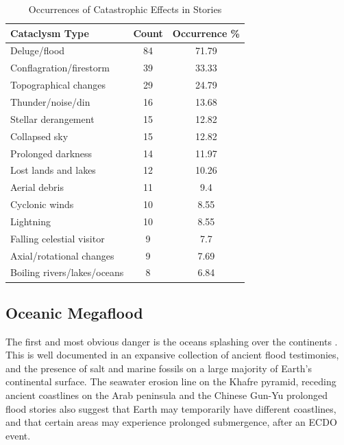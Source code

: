 \documentclass[10pt,twocolumn,letterpaper]{article}
\begin{document}
\begin{table}[ht]
\begin{center}
\renewcommand{\arraystretch}{1.2}  %
\begin{tabular}{|l|c|c|}
\hline
\textbf{Cataclysm Type} & \textbf{Count} & \textbf{Occurrence \%} \\
\hline\hline
Deluge/flood            & 84 & 71.79 \\
Conflagration/firestorm & 39 & 33.33 \\
Topographical changes   & 29 & 24.79 \\
Thunder/noise/din       & 16 & 13.68 \\
Stellar derangement     & 15 & 12.82 \\
Collapsed sky           & 15 & 12.82 \\
Prolonged darkness      & 14 & 11.97 \\
Lost lands and lakes    & 12 & 10.26 \\
Aerial debris           & 11 & 9.4   \\
Cyclonic winds          & 10 & 8.55  \\
Lightning               & 10 & 8.55  \\
Falling celestial visitor & 9 & 7.7 \\
Axial/rotational changes & 9 & 7.69  \\
Boiling rivers/lakes/oceans & 8 & 6.84 \\
\hline
\end{tabular}
\end{center}
\caption{Occurrences of Catastrophic Effects in Stories \cite{12}}
\label{tab: 1}
\end{table}

\subsection{Oceanic Megaflood}

The first and most obvious danger is the oceans splashing over the continents \cite{3}. This is well documented in an expansive collection of ancient flood testimonies, and the presence of salt and marine fossils on a large majority of Earth's continental surface. The seawater erosion line on the Khafre pyramid, receding ancient coastlines on the Arab peninsula \cite{1} and the Chinese Gun-Yu prolonged flood stories also suggest that Earth may temporarily have different coastlines, and that certain areas may experience prolonged submergence, after an ECDO event.
\end{document}
